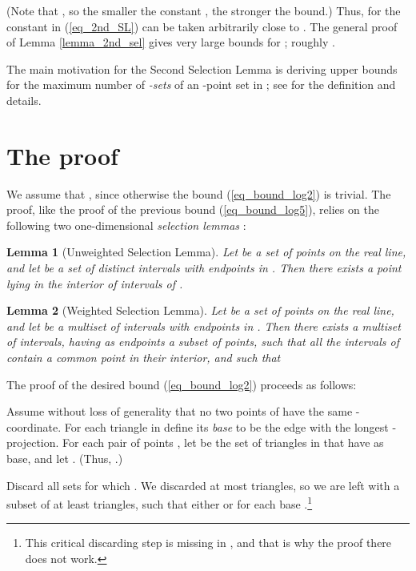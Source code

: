 \documentclass[11pt]{article}
\newtheorem{lemma}{Lemma}
\begin{document}
(Note that , so the smaller the constant ,
the stronger the bound.) Thus, for  the constant  in
(\ref{eq_2nd_SL}) can be taken arbitrarily close to . The general
proof of Lemma \ref{lemma_2nd_sel} gives very large bounds for
; roughly .

The main motivation for the Second Selection Lemma is deriving upper
bounds for the maximum number of \emph{-sets} of an -point set
in ; see \cite[ch.~11]{matou} for the definition and
details.

\section{The proof}

We assume that , since otherwise the
bound (\ref{eq_bound_log2}) is trivial. The proof, like the proof of
the previous bound (\ref{eq_bound_log5}), relies on the following
two one-dimensional \emph{selection lemmas} \cite{ACEGSW}:

\begin{lemma}[Unweighted Selection Lemma]\label{lemma_unw}
Let  be a set of  points on the real line, and let  be a
set of  distinct intervals with endpoints in . Then there
exists a point  lying in the interior of 
intervals of .
\end{lemma}

\begin{lemma}[Weighted Selection Lemma]\label{lemma_weighted}
Let  be a set of  points on the real line, and let  be a
\emph{multiset} of  intervals with endpoints in . Then there
exists a multiset  of  intervals, having as
endpoints a subset  of  points, such that all
the intervals of  contain a common point  in their interior,
and such that

\end{lemma}

The proof of the desired bound (\ref{eq_bound_log2}) proceeds as
follows:

Assume without loss of generality that no two points of  have the
same -coordinate. For each triangle in  define its \emph{base}
to be the edge with the longest -projection. For each pair of
points , let  be the set of triangles in  that
have  as base, and let . (Thus, .)

Discard all sets  for which . We discarded
at most  triangles, so we are left with a
subset  of at least  triangles, such that either  or  for each base .\footnote{This critical
discarding step is missing in \cite{eppstein}, and that is why the
proof there does not work.}
\end{document}

